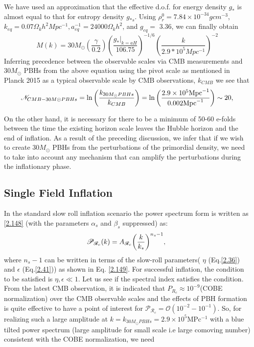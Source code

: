 We have used an approximation that the effective d.o.f. for energy density $g_*$ is almost equal to that for entropy density $g_{*s}$. Using $\rho_r^0=7.84 \times 10^{-34}g cm^{-3}$, $k_{eq}=0.07 \Omega_k h^2 Mpc^{-1}, a_{eq}^{-1}=24000 \Omega_k h^2$, and $g_{eq}=$ 3.36, we can finally obtain 
\begin{equation}
    M(k)=30 M_{\odot}\left(\frac{\gamma} {0.2}\right)\left(\frac{\left.g_*\right|_{k=a H}}{106.75}\right)^{-1 / 6}\left(\frac{k}{2.9 * 10^{5} Mpc^{-1}}\right)^{-2} \label{3.38}
\end{equation}
Inferring precedence between the observable scales via CMB measurements and $30 M_{\odot}$ PBHs from the above equation using the pivot scale as mentioned in Planck 2015\cite{Planck:2015fie} as a typical observable scale by CMB observations, $k_{CMB}$ we see that
\begin{align}
    \mathcal{N}_{CMB -30M{\odot} PBHs} = \ln\qty(\frac{k_{30M_{\odot} PBHs}}{k _{CMB}}) = \ln \qty(\frac{2.9 \times 10^{5} \text{Mpc}^{-1}}{0.002 \text{Mpc}^{-1}}) \sim 20, \label{3.39}
\end{align}

On the other hand, it is necessary for there to be a minimum of 50-60 e-folds between the time the existing horizon scale leaves the Hubble horizon and the end of inflation.
As a result of the preceding discussion, we infer that if we wish to create $30M_{\odot}$ PBHs from the perturbations of the primordial density, we need to take into account any mechanism that can amplify the perturbations during the inflationary phase.



\subsection{Single Field Inflation}
In the standard slow roll inflation scenario the power spectrum form is written as \ref{2.148} (with the parameters $\alpha_s$ and $\beta_s$ suppressed) as:
\begin{align}
    \mathcal{P}_{\mathcal{R}_c}(k) = A_{\mathcal{R}_c}\qty(\frac{k}{k_{*}})^{n_s - 1}, \ \label{3.40}
\end{align}
where $n_s -1 $ can be written in terms of the slow-roll parameters( $\eta$ (Eq.\ref{2.36}) and $\epsilon$ (Eq.\ref{2.41})) as shown in Eq. \ref{2.149}.
For successful inflation, the condition to be satisfied is $\eta,\epsilon \ll 1$. Let us see if the spectral index satisfies the condition. \\
From the latest CMB observation, it is indicated that $P_{R_c} \approx 10^{-9}$(COBE normalization) over the CMB observable scales and the effects of PBH formation is quite effective to have a point of interest for  $\mathcal{P}_{\mathcal{R}_c}  = \mathcal{O}(10^{-2} - 10^{-1})$. So, for realizing such a large amplitude at $k = k_{30M_{\odot} PBHs} = 2.9 \times 10^5 \mathrm{MPc^{-1}}$ with a blue tilted power spectrum (large amplitude for small scale i.e large comoving number) consistent with the COBE normalization, we need \cite{Sasaki_2018}

